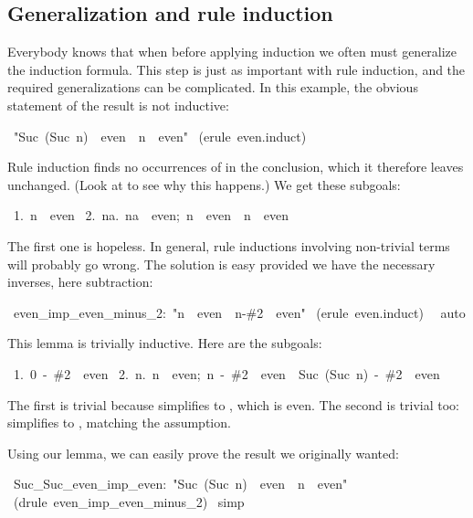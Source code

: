\subsection{Generalization and rule induction}

Everybody knows that when before applying induction we often must generalize
the induction formula.  This step is just as important with rule induction,
and the required generalizations can be complicated.  In this 
example, the obvious statement of the result is not inductive:
%
\begin{isabelle}
\ "Suc\ (Suc\ n)\ \isasymin \ even\
\isasymLongrightarrow \ n\ \isasymin \ even"\isanewline
{}\ (erule\ even.induct)\isanewline
{}
\end{isabelle}
%
Rule induction finds no occurrences of  in the
conclusion, which it therefore leaves unchanged.  (Look at
 to see why this happens.)  We get these subgoals:
\begin{isabelle}
\ 1.\ n\ \isasymin \ even\isanewline
\ 2.\ \isasymAnd na.\ \isasymlbrakk na\ \isasymin \ even;\ n\ \isasymin \ even\isasymrbrakk \ \isasymLongrightarrow \ n\ \isasymin \ even%
\end{isabelle}
The first one is hopeless.  In general, rule inductions involving
non-trivial terms will probably go wrong.  The solution is easy provided
we have the necessary inverses, here subtraction:
\begin{isabelle}
\ even_imp_even_minus_2:\ "n\ \isasymin \ even\ \isasymLongrightarrow \ n-\#2\ \isasymin \ even"\isanewline
{}\ (erule\ even.induct)\isanewline
\ \isacommand{apply}\ auto\isanewline
{}
\end{isabelle}
%
This lemma is trivially inductive.  Here are the subgoals:
\begin{isabelle}
\ 1.\ 0\ -\ \#2\ \isasymin \ even\isanewline
\ 2.\ \isasymAnd n.\ \isasymlbrakk n\ \isasymin \ even;\ n\ -\ \#2\ \isasymin \ even\isasymrbrakk \ \isasymLongrightarrow \ Suc\ (Suc\ n)\ -\ \#2\ \isasymin \ even%
\end{isabelle}
The first is trivial because  simplifies to , which is
even.  The second is trivial too: \isa{Suc\ (Suc\ n)\ -\ \#2} simplifies to
\isa{n}, matching the assumption.

\medskip
Using our lemma, we can easily prove the result we originally wanted:
\begin{isabelle}
\ Suc_Suc_even_imp_even:\ "Suc\ (Suc\ n)\ \isasymin \ even\ \isasymLongrightarrow \ n\ \isasymin \ even"\isanewline
{}\ (drule\ even_imp_even_minus_2)\isanewline
\isacommand{apply}\ simp\isanewline
{}
\end{isabelle}

